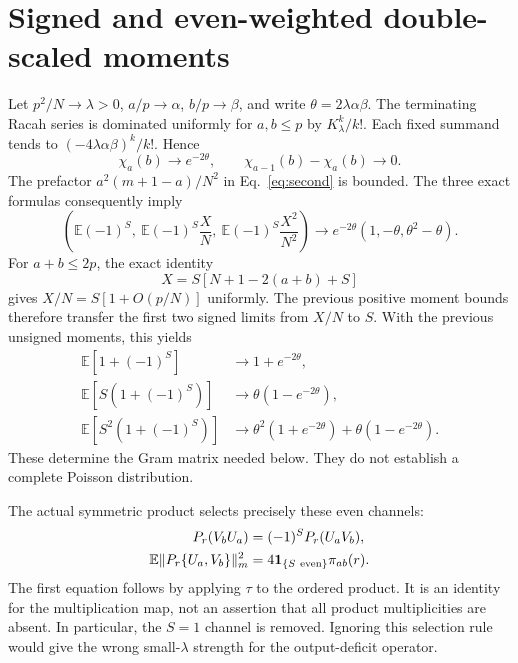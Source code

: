 \documentclass[11pt,a4paper]{article}
\newcommand{\EE}{\mathbb E}
\begin{document}
\newpage
\section{Signed and even-weighted double-scaled moments}
Let $p^2/N\to\lambda>0$, $a/p\to\alpha$, $b/p\to\beta$,
and write $\theta=2\lambda\alpha\beta$.
The terminating Racah series is dominated uniformly for $a,b\le p$
by $K_\lambda^k/k!$. Each fixed summand tends to
$(-4\lambda\alpha\beta)^k/k!$. Hence
\begin{equation}
 \chi_a(b)\longrightarrow e^{-2\theta},\qquad
 \chi_{a-1}(b)-\chi_a(b)\longrightarrow0.
\end{equation}
The prefactor $a^2(m+1-a)/N^2$ in Eq.~\eqref{eq:second} is bounded.
The three exact formulas consequently imply
\begin{equation}
 \left(\EE(-1)^S,\ \EE(-1)^S\frac XN,
                   \ \EE(-1)^S\frac{X^2}{N^2}\right)
 \longrightarrow e^{-2\theta}(1,-\theta,\theta^2-\theta).
\end{equation}
For $a+b\le2p$, the exact identity
\begin{equation}
 X=S[N+1-2(a+b)+S]
\end{equation}
gives $X/N=S[1+O(p/N)]$ uniformly. The previous positive moment
bounds therefore transfer the first two signed limits from $X/N$
to $S$. With the previous unsigned moments, this yields
\begin{align}
 \EE[1+(-1)^S]&\to1+e^{-2\theta},\\
 \EE[S(1+(-1)^S)]&\to\theta(1-e^{-2\theta}),\\
 \EE[S^2(1+(-1)^S)]&\to
             \theta^2(1+e^{-2\theta})+\theta(1-e^{-2\theta}).
 \label{eq:even}
\end{align}
These determine the Gram matrix needed below. They do not establish
a complete Poisson distribution.

The actual symmetric product selects precisely these even channels:
\begin{align}
 P_r(V_bU_a)&=(-1)^S P_r(U_aV_b),\\
 \EE\|P_r\{U_a,V_b\}\|_m^2
   &=4\mathbf1_{\{S\ {\rm even}\}}\pi_{ab}(r).
\end{align}
The first equation follows by applying $\tau$ to the ordered product.
It is an identity for the multiplication map, not an assertion that
all product multiplicities are absent. In particular, the $S=1$
channel is removed. Ignoring this selection rule would give the
wrong small-$\lambda$ strength for the output-deficit operator.
\end{document}
